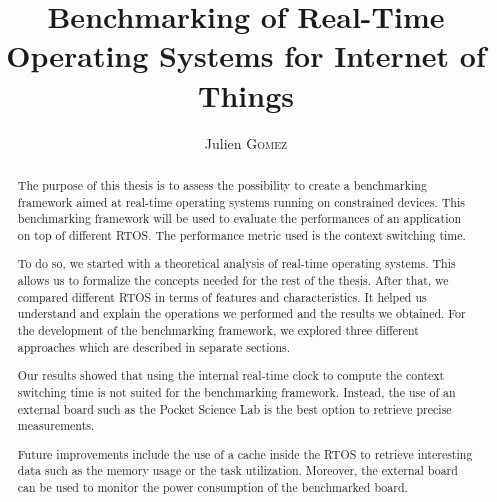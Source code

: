\documentclass{EPL-master-thesis-covers-EN}
\title{Benchmarking of Real-Time Operating Systems for Internet of Things}
\author{Julien \textsc{Gomez}}
\begin{document}
  \maketitle

\cleardoublepage
{}

 \begin{abstract}

    The purpose of this thesis is to assess the possibility to create a benchmarking framework aimed at 
      real-time operating systems running on constrained devices. 
    This benchmarking framework will be used to evaluate the performances of an application on top of different RTOS.
    The performance metric used is the context switching time.

    To do so, we started with a theoretical analysis of real-time operating systems.
    This allows us to formalize the concepts needed for the rest of the thesis.
    After that, we compared different RTOS in terms of features and characteristics.
    It helped us understand and explain the operations we performed and the results we obtained.
    For the development of the benchmarking framework, we explored three different approaches which are described in separate sections.
    
    Our results showed that using the internal real-time clock to compute the context switching time is not suited for the benchmarking framework.
    Instead, the use of an external board such as the Pocket Science Lab is the best option to retrieve precise measurements.

    Future improvements include the use of a cache inside the RTOS to retrieve interesting data such as the memory usage or the task utilization.
    Moreover, the external board can be used to monitor the power consumption of the benchmarked board.
    
 \end{abstract}
\end{document}
